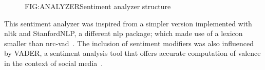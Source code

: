 \begin{figure}[Sentiment analyzer]{FIG:ANALYZER}{Sentiment analyzer structure}\hspace*{1.4em}
\end{figure}

This sentiment analyzer was inspired from a simpler version implemented with \acs{nltk} and StanfordNLP, a different \acl{nlp} package; which made use of a lexicon smaller than \acs{nrc}-\acs{vad}~\cite{SENTIMENTANALYSIS}. The inclusion of sentiment modifiers was also influenced by VADER, a sentiment analysis tool that offers accurate computation of valence in the context of social media~\cite{VADER}.